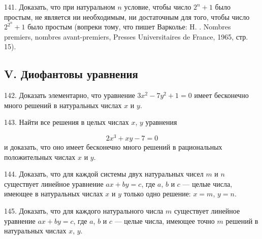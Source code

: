 \documentclass[12pt, a4paper, openany]{book}
\begin{document}
141. Доказать, что при натуральном $n$ условие, чтобы число $2^n+1$ было простым, не является ни необходимым, ни достаточным для того, чтобы число $\displaystyle 2^{2^n}+1$ было простым (вопреки тому, что пишет Варколье: H. . Nombres premiers, nombres avant-premiers, Presses Universitaires de France, 1965, стр. 15).

\subsection[V. Диофантовы уравнения (142-201)]{\center V. Диофантовы уравнения}

142. Доказать элементарно, что уравнение $3x^2-7y^2+1=0$ имеет бесконечно много решений в натуральных числах $x$ и $y$.

143. Найти все решения в целых числах $x$, $y$ уравнения

$$ 2x^3+xy-7=0 $$
и доказать, что оно имеет бесконечно много решений в рациональных положительных числах $x$ и $y$.

144. Доказать, что для каждой системы двух натуральных чисел $m$ и $n$ существует линейное уравнение $ax+by=c$, где $a$, $b$ и $c$ — целые числа, имеющее в натуральных числах $x$ и $y$ только одно решение: $x=m$, $y=n$.

145. Доказать, что для каждого натурального числа $m$ существует линейное уравнение $ax+by=c$, где $a$, $b$ и $c$ — целые числа, имеющее точно $m$ решений в натуральных числах $x$, $y$.











\newpage
\end{document}
